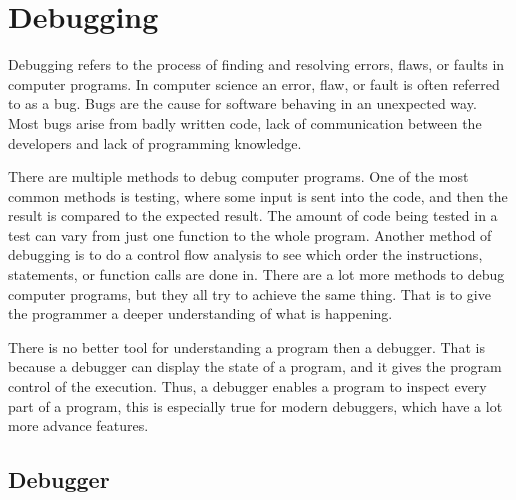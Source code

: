 \section{Debugging}
 

Debugging refers to the process of finding and resolving errors, flaws, or faults in computer programs.
In computer science an error, flaw, or fault is often referred to as a bug.
Bugs are the cause for software behaving in an unexpected way.
Most bugs arise from badly written code, lack of communication between the developers and lack of programming knowledge.


There are multiple methods to debug computer programs.
One of the most common methods is testing, where some input is sent into the code, and then the result is compared to the expected result.
The amount of code being tested in a test can vary from just one function to the whole program.
Another method of debugging is to do a control flow analysis to see which order the instructions, statements, or function calls are done in.
There are a lot more methods to debug computer programs, but they all try to achieve the same thing.
That is to give the programmer a deeper understanding of what is happening.


There is no better tool for understanding a program then a debugger.
That is because a debugger can display the state of a program, and it gives the program control of the execution.
Thus, a debugger enables a program to inspect every part of a program, this is especially true for modern debuggers, which have a lot more advance features.


\subsection{Debugger}
 
